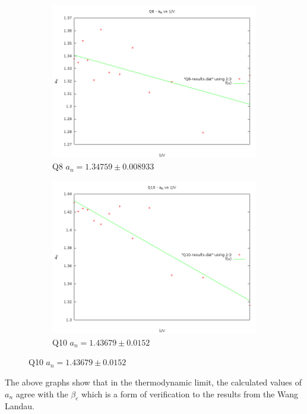 \begin{figure}[H]
\begin{subfigure}[b]{0.45\textwidth}
    \includegraphics[width=\textwidth]{4-Results/Q8-Verification.png}
    \caption{Q8 $a_n = 1.34759 \pm 0.008933$}
\end{subfigure}
\begin{subfigure}[b]{0.45\textwidth}
    \includegraphics[width=\textwidth]{4-Results/Q10-Verification.png}
    \caption{Q10 $a_n = 1.43679 \pm 0.0152$}
\end{subfigure}
\end{figure}

The above graphs show that in the thermodynamic limit, the calculated values of $a_n$ agree with the $\beta_c$ which is a form of verification to the results from the Wang Landau.

